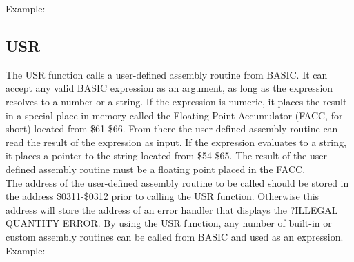 Example:\\


\subsection{USR}

The {\ttfamily USR} function calls a user-defined assembly routine from BASIC.
It can accept any valid BASIC expression as an argument, as long as the
expression resolves to a number or a string.  If the expression is numeric, it
places the result in a special place in memory called the Floating Point
Accumulator (FACC, for short) located from {\ttfamily \$61-\$66}.  From there
the user-defined assembly routine can read the result of the expression as
input.  If the expression evaluates to a string, it places a pointer to the
string located from {\ttfamily \$54-\$65}.  The result of the user-defined
assembly routine must be a floating point placed in the FACC.\\

The address of the user-defined assembly routine to be called should be stored
in the address {\ttfamily \$0311-\$0312} prior to calling the {\ttfamily USR}
function.  Otherwise this address will store the address of an error handler
that displays the {\ttfamily ?ILLEGAL QUANTITY ERROR}.  By using the {\ttfamily
USR} function, any number of built-in or custom assembly routines can be called
from BASIC and used as an expression.\\

Example:\\



